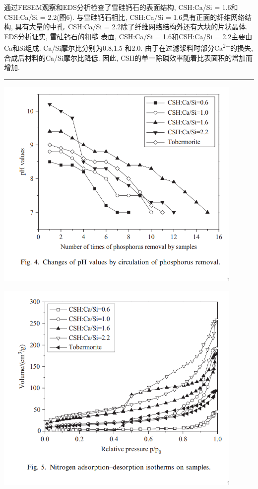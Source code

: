 \documentclass[11pt]{article}
\begin{document}
通过FESEM观察和EDS分析检查了雪硅钙石的表面结构, CSH:Ca/Si = 1.6和CSH:Ca/Si =
2.2(图6). 与雪硅钙石相比, CSH:Ca/Si = 1.6具有正面的纤维网络结构, 具有大量的中孔.
CSH:Ca/Si = 2.2除了纤维网络结构外还有大块的片状晶体. EDS分析证实, 雪硅钙石的粗糙
表面, CSH:Ca/Si = 1.6和CSH:Ca/Si = 2.2主要由Ca和Si组成. Ca/Si摩尔比分别为0.8,1.5
和2.0. 由于在过滤浆料时部分Ca\textsuperscript{2+}的损失, 合成后材料的Ca/Si摩尔比降低. 因此, CSH的单一除磷效率随着比表面积的增加而增加.

\noindent\rule{\textwidth}{0.5pt}

\includegraphics[width=0.9\textwidth]{fig.4.png}
 \label{tab:title}

\includegraphics[width=0.9\textwidth]{fig.5.png}
 \label{tab:title}
\end{document}

